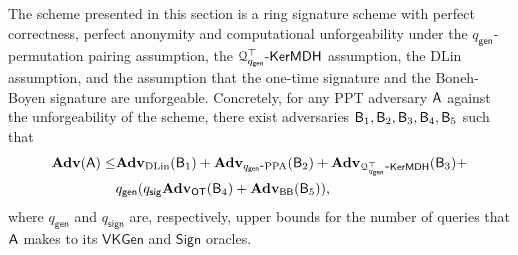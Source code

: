 \begin{theorem}
The scheme presented in this section is a ring signature scheme
with perfect correctness, perfect anonymity and computational unforgeability under the
$q_\mathsf{gen}$-permutation pairing assumption, the $\mathcal{Q}_{q_\mathsf{gen}}^\top\mbox{-}\mathsf{KerMDH}$ assumption, the $\mathrm{DLin}$ assumption, and the assumption
that the one-time signature and the Boneh-Boyen signature are unforgeable.
Concretely, for any PPT adversary $\mathsf{A}$ against the unforgeability of the scheme, there exist adversaries $\mathsf{B}_1,\mathsf{B}_2,\mathsf{B}_3,\mathsf{B}_4,\mathsf{B}_5$ such that
\begin{align*}
\mathbf{Adv}(\mathsf{A})\leq &\mathbf{Adv}_{\mathrm{DLin}}(\mathsf{B}_1)+\mathbf{Adv}_{q_\mathsf{gen}\mbox{-}\mathrm{PPA}}(\mathsf{B}_2)+\mathbf{Adv}_{\mathcal{Q}^\top_{q_\mathsf{gen}}\mbox{-}\mathsf{KerMDH}}(\mathsf{B}_3)+\\
&q_\mathsf{gen}(q_\mathsf{sig}\mathbf{Adv}_{\mathsf{OT}}(\mathsf{B}_4)+\mathbf{Adv}_{\mathsf{BB}}(\mathsf{B}_5)),
\end{align*}
where $q_\mathsf{gen}$ and $q_\mathsf{sign}$ are, respectively, upper bounds for the number of queries that $\mathsf{A}$ makes to its $\mathsf{VKGen}$ and $\mathsf{Sign}$ oracles.
\end{theorem}
